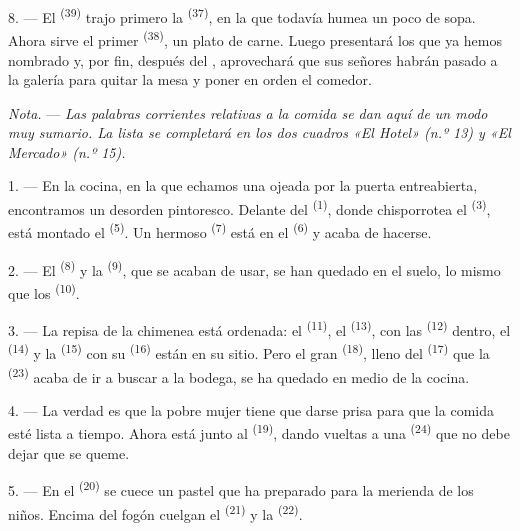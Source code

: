 8. --- El  \textsuperscript{(39)} trajo primero la 
\textsuperscript{(37)}, en la que todavía humea un poco de sopa. Ahora sirve el
primer  \textsuperscript{(38)}, un plato de carne. Luego presentará los
que ya hemos nombrado y, por fin, después del , aprovechará
que sus señores habrán pasado a la galería para quitar la mesa y poner en
orden el comedor.

\textit{Nota.} --- \textit{Las palabras corrientes relativas a la comida
se dan aquí de un modo muy sumario. La lista se completará en los dos
cuadros «El Hotel» (n.º 13) y «El Mercado» (n.º 15).}

\VUsaut{4.6mm}
\VUsaut{3.0mm}

1. --- En la cocina, en la que echamos una ojeada por la puerta
entreabierta, encontramos un desorden pintoresco. Delante del
 \textsuperscript{(1)}, donde chisporrotea el 
\textsuperscript{(3)}, está montado el  \textsuperscript{(5)}. Un
hermoso  \textsuperscript{(7)} está en el 
\textsuperscript{(6)} y acaba de hacerse.

2. --- El  \textsuperscript{(8)} y la 
\textsuperscript{(9)}, que se acaban de usar, se han quedado en el suelo, lo mismo
que los  \textsuperscript{(10)}.

3. --- La repisa de la chimenea está ordenada: el 
\textsuperscript{(11)}, el  \textsuperscript{(13)}, con las
 \textsuperscript{(12)} dentro, el 
\textsuperscript{(14)} y la  \textsuperscript{(15)} con su 
\textsuperscript{(16)} están en su sitio. Pero el gran 
\textsuperscript{(18)}, lleno del  \textsuperscript{(17)} que la
 \textsuperscript{(23)} acaba de ir a buscar a la bodega, se ha
quedado en medio de la cocina.

4. --- La verdad es que la pobre mujer tiene que darse prisa para que la
comida esté lista a tiempo. Ahora está junto al 
\textsuperscript{(19)}, dando vueltas a una  \textsuperscript{(24)} que no
debe dejar que se queme.

5. --- En el  \textsuperscript{(20)} se cuece un pastel que ha
preparado para la merienda de los niños. Encima del fogón cuelgan el
 \textsuperscript{(21)} y la  \textsuperscript{(22)}.

